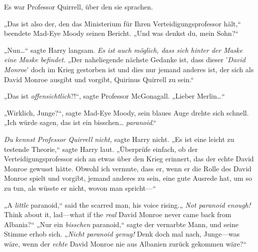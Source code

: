 Es war Professor Quirrell, über den sie sprachen.

„Das ist also der, den das Ministerium für Ihren Verteidigungsprofessor hält,“ beendete Mad-Eye Moody seinen Bericht. „Und was denkst du, mein Sohn?“

„Nun…“ sagte Harry langsam. \emph{Es ist auch möglich, dass sich hinter der Maske eine Maske befindet.} „Der naheliegende nächste Gedanke ist, dass dieser '\emph{David Monroe}' doch im Krieg gestorben ist und dies nur jemand anderes ist, der sich als David Monroe ausgibt und vorgibt, Quirinus Quirrell zu sein.“

„Das ist \emph{offensichtlich}?!“, sagte Professor McGonagall. „Lieber Merlin…“

„Wirklich, Junge?“, sagte Mad-Eye Moody, sein blaues Auge drehte sich schnell. „Ich würde sagen, das ist ein bisschen… \emph{paranoid}.“

\emph{Du kennst Professor Quirrell nicht,} sagte Harry nicht.
„Es ist eine leicht zu testende Theorie,“ sagte Harry laut. „Überprüfe einfach, ob der Verteidigungsprofessor sich an etwas über den Krieg erinnert, das der echte David Monroe gewusst hätte. Obwohl ich vermute, dass er, wenn er die Rolle des David Monroe spielt und vorgibt, jemand anderes zu sein, eine gute Ausrede hat, um so zu tun, als wüsste er nicht, wovon man spricht—“

„A \emph{little} paranoid,“ said the scarred man, his voice rising.„ \emph{Not paranoid enough! } Think about it, lad—what if the \emph{real} David Monroe never came back from Albania?“
„Nur ein \emph{bisschen} paranoid,“ sagte der vernarbte Mann, und seine Stimme erhob sich. „\emph{Nicht paranoid genug! } Denk doch mal nach, Junge—was wäre, wenn der \emph{echte} David Monroe nie aus Albanien zurück gekommen wäre?“

